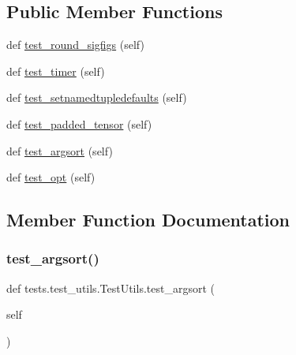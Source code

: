 \subsection*{Public Member Functions}
\begin{DoxyCompactItemize}
\item 
def \hyperlink{classtests_1_1test__utils_1_1TestUtils_aa020fc67900c834a020730f29cacc916}{test\+\_\+round\+\_\+sigfigs} (self)
\item 
def \hyperlink{classtests_1_1test__utils_1_1TestUtils_aa4b5f19e38d6da7a8947226c60007184}{test\+\_\+timer} (self)
\item 
def \hyperlink{classtests_1_1test__utils_1_1TestUtils_a211bff449c261cce734e51e3a937d1af}{test\+\_\+setnamedtupledefaults} (self)
\item 
def \hyperlink{classtests_1_1test__utils_1_1TestUtils_a9d3d0280ce67a3e6b039b9184844dc45}{test\+\_\+padded\+\_\+tensor} (self)
\item 
def \hyperlink{classtests_1_1test__utils_1_1TestUtils_ad9ee6ef6b6ce7d9f168234eddf5d3716}{test\+\_\+argsort} (self)
\item 
def \hyperlink{classtests_1_1test__utils_1_1TestUtils_a595e1217b715af6a4670ee244c9aa61f}{test\+\_\+opt} (self)
\end{DoxyCompactItemize}


\subsection{Member Function Documentation}
\mbox{\label{classtests_1_1test__utils_1_1TestUtils_ad9ee6ef6b6ce7d9f168234eddf5d3716}} 
\subsubsection{\texorpdfstring{test\+\_\+argsort()}{test\_argsort()}}
{\footnotesize\ttfamily def tests.\+test\+\_\+utils.\+Test\+Utils.\+test\+\_\+argsort (\begin{DoxyParamCaption}\item[{}]{self }\end{DoxyParamCaption})}

\mbox{\label{classtests_1_1test__utils_1_1TestUtils_a595e1217b715af6a4670ee244c9aa61f}} 
